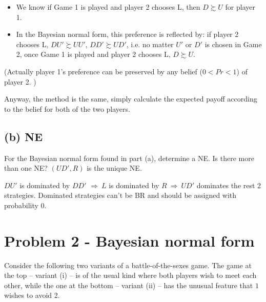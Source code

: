 \documentclass{article}
\begin{document}
\begin{mdframed}[backgroundcolor=blue!20,linecolor=white]
\begin{itemize}
\begin{itemize}
\item We know if Game 1 is played and player 2 chooses L, then $D \succsim U$ for player 1.
\item In the Bayesian normal form, this preference is reflected by: if player 2 chooses L, $DU' \succsim UU'$, $DD' \succsim UD'$, i.e. no matter $U'$ or $D'$ is chosen in Game 2, once Game 1 is played and player 2 chooses L,  $D \succsim U$.
\end{itemize}
(Actually player 1's  preference can be preserved by any belief ($0<Pr<1$) of player 2. )

\end{itemize}

Anyway, the method is the same, simply calculate the expected payoff according to the belief for both of the two players.
\end{mdframed}


\subsection*{(b) NE}

For the Bayesian normal form found in part (a), determine a NE. Is there more than one NE?
$(UD',R)$ is the unique NE.

\begin{mdframed}[backgroundcolor=blue!20,linecolor=white]
$DU'$ is dominated by $DD'$ $\Rightarrow \ L$ is dominated by $R \ \Rightarrow \ UD'$ dominates the rest 2 strategies. Dominated strategies can't be BR and should be assigned with probability 0.
\end{mdframed}

\section{Problem 2 - Bayesian normal form}

Consider the following two variants of a battle-of-the-sexes game. The game at the top --
variant (i) -- is of the usual kind where both players wish to meet each other, while the one
at the bottom -- variant (ii) -- has the unusual feature that $1$ wishes to avoid 2.\vspace{-6pt}

\end{document}
